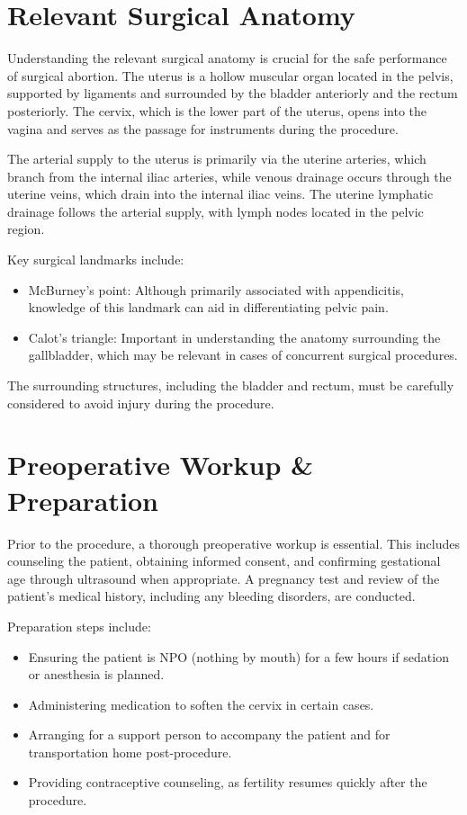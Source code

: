 \section*{Relevant Surgical Anatomy}
Understanding the relevant surgical anatomy is crucial for the safe performance of surgical abortion. The uterus is a hollow muscular organ located in the pelvis, supported by ligaments and surrounded by the bladder anteriorly and the rectum posteriorly. The cervix, which is the lower part of the uterus, opens into the vagina and serves as the passage for instruments during the procedure. 

The arterial supply to the uterus is primarily via the uterine arteries, which branch from the internal iliac arteries, while venous drainage occurs through the uterine veins, which drain into the internal iliac veins. The uterine lymphatic drainage follows the arterial supply, with lymph nodes located in the pelvic region. 

Key surgical landmarks include:

\begin{itemize}
  \item McBurney's point: Although primarily associated with appendicitis, knowledge of this landmark can aid in differentiating pelvic pain.
  \item Calot's triangle: Important in understanding the anatomy surrounding the gallbladder, which may be relevant in cases of concurrent surgical procedures.
\end{itemize}

The surrounding structures, including the bladder and rectum, must be carefully considered to avoid injury during the procedure.

\section*{Preoperative Workup \& Preparation}
Prior to the procedure, a thorough preoperative workup is essential. This includes counseling the patient, obtaining informed consent, and confirming gestational age through ultrasound when appropriate. A pregnancy test and review of the patient's medical history, including any bleeding disorders, are conducted. 

Preparation steps include:

\begin{itemize}
  \item Ensuring the patient is NPO (nothing by mouth) for a few hours if sedation or anesthesia is planned.
  \item Administering medication to soften the cervix in certain cases.
  \item Arranging for a support person to accompany the patient and for transportation home post-procedure.
  \item Providing contraceptive counseling, as fertility resumes quickly after the procedure.
\end{itemize}

